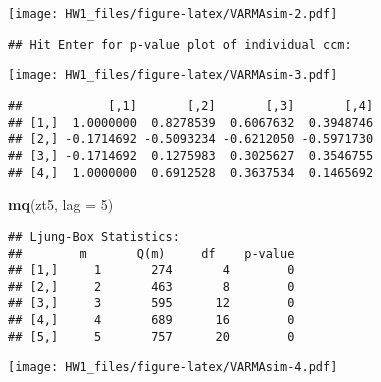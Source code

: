 \documentclass[]{article}
\newenvironment{Shaded}{\begin{snugshade}}{\end{snugshade}}
\newcommand{\KeywordTok}[1]{\textcolor[rgb]{0.13,0.29,0.53}{\textbf{#1}}}
\newcommand{\DataTypeTok}[1]{\textcolor[rgb]{0.13,0.29,0.53}{#1}}
\newcommand{\DecValTok}[1]{\textcolor[rgb]{0.00,0.00,0.81}{#1}}
\newcommand{\OperatorTok}[1]{\textcolor[rgb]{0.81,0.36,0.00}{\textbf{#1}}}
\newcommand{\NormalTok}[1]{#1}
\begin{document}
\texttt{[image: HW1\_files/figure-latex/VARMAsim-2.pdf]}

\begin{verbatim}
## Hit Enter for p-value plot of individual ccm:
\end{verbatim}

\texttt{[image: HW1\_files/figure-latex/VARMAsim-3.pdf]}

\begin{Shaded}
\end{Shaded}

\begin{verbatim}
##            [,1]       [,2]       [,3]       [,4]
## [1,]  1.0000000  0.8278539  0.6067632  0.3948746
## [2,] -0.1714692 -0.5093234 -0.6212050 -0.5971730
## [3,] -0.1714692  0.1275983  0.3025627  0.3546755
## [4,]  1.0000000  0.6912528  0.3637534  0.1465692
\end{verbatim}

\begin{Shaded}
\begin{Highlighting}[]
\KeywordTok{mq}\NormalTok{(zt5, }\DataTypeTok{lag =} \DecValTok{5}\NormalTok{)}
\end{Highlighting}
\end{Shaded}

\begin{verbatim}
## Ljung-Box Statistics:  
##        m       Q(m)     df    p-value
## [1,]     1       274       4        0
## [2,]     2       463       8        0
## [3,]     3       595      12        0
## [4,]     4       689      16        0
## [5,]     5       757      20        0
\end{verbatim}

\texttt{[image: HW1\_files/figure-latex/VARMAsim-4.pdf]}
\end{document}
